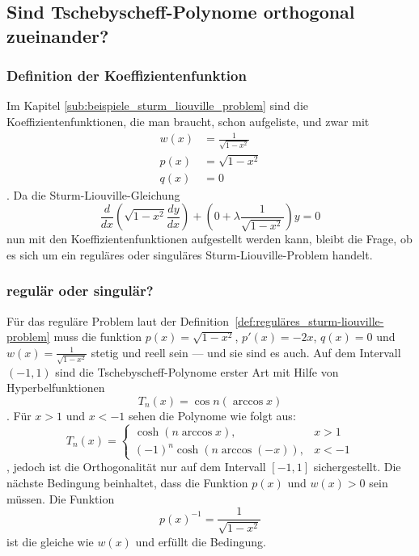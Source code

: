 %
%
%

\subsection{Sind Tschebyscheff-Polynome orthogonal zueinander?
\label{sub:tschebyscheff-polynome}}
\subsubsection*{Definition der Koeffizientenfunktion}
Im Kapitel \ref{sub:beispiele_sturm_liouville_problem} sind die
Koeffizientenfunktionen, die man braucht, schon aufgeliste, und zwar mit
\begin{align*}
	w(x) &= \frac{1}{\sqrt{1-x^2}} \\
	p(x) &= \sqrt{1-x^2} \\
	q(x) &= 0
\end{align*}.
Da die Sturm-Liouville-Gleichung
\begin{equation}
	\label{eq:sturm-liouville-equation-tscheby}
	\frac{d}{dx} (\sqrt{1-x^2} \frac{dy}{dx}) +
	(0 + \lambda \frac{1}{\sqrt{1-x^2}}) y
	=
	0 
\end{equation}
nun mit den Koeffizientenfunktionen aufgestellt werden kann, bleibt die Frage,
ob es sich um ein reguläres oder singuläres Sturm-Liouville-Problem handelt.

\subsubsection*{regulär oder singulär?}
Für das reguläre Problem laut der
Definition~\ref{def:reguläres_sturm-liouville-problem} muss die funktion
$p(x) = \sqrt{1-x^2}$, $p'(x) = -2x$, $q(x) = 0$ und
$w(x) = \frac{1}{\sqrt{1-x^2}}$ stetig und reell sein --- und sie sind es auch.
Auf dem Intervall $(-1,1)$ sind die Tschebyscheff-Polynome erster Art mit Hilfe
von Hyperbelfunktionen
\begin{equation}
	T_n(x)
	=
	\cos n (\arccos x)
\end{equation}.
Für $x>1$ und $x<-1$ sehen die Polynome wie folgt aus:
\begin{equation}
	T_n(x) = \left\{\begin{array}{ll} \cosh (n \arccos x), & x > 1\\
		(-1)^n \cosh (n \arccos (-x)), & x<-1 \end{array}\right.
\end{equation},
jedoch ist die Orthogonalität nur auf dem Intervall $[ -1, 1]$ sichergestellt.
Die nächste Bedingung beinhaltet, dass die Funktion $p(x)$ und $w(x)>0$ sein
müssen.
Die Funktion
\begin{equation*}
	p(x)^{-1} = \frac{1}{\sqrt{1-x^2}}
\end{equation*}
ist die gleiche wie $w(x)$ und erfüllt die Bedingung.

